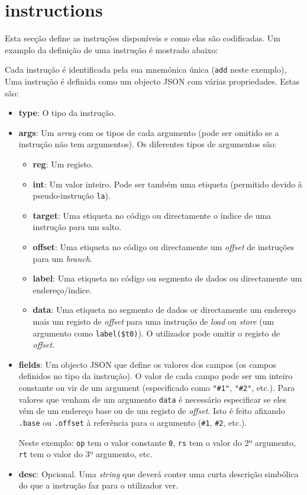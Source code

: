 \documentclass[11pt,a4paper,twoside,titlepage]{report}
\begin{document}
\section{instructions}

Esta secção define as instruções disponíveis e como elas são codificadas.
Um examplo da definição de uma instrução é mostrado abaixo:



Cada instrução é identificada pela sua mnemónica única (\verb+add+ neste exemplo),
Uma instrução é definida como um objecto JSON com várias propriedades. Estas são:

\begin{itemize}
	\item \textbf{type}: O tipo da instrução.
	\item \textbf{args}: Um \emph{array} com os tipos de cada argumento (pode ser
		omitido se a instrução não tem argumentos).
		Os diferentes tipos de argumentos são:
		\begin{itemize}
			\item \textbf{reg}: Um registo.
			\item \textbf{int}: Um valor inteiro. Pode ser também uma etiqueta
				(permitido devido à pseudo-instrução \verb+la+).
			\item \textbf{target}: Uma etiqueta no código ou directamente o índice de
				uma instrução para um salto.
			\item \textbf{offset}: Uma etiqueta no código ou directamente um
				\emph{offset} de instruções para um \emph{branch}.
			\item \textbf{label}: Uma etiqueta no código ou segmento de dados ou
				directamente um endereço/índice.
			\item \textbf{data}: Uma etiqueta no segmento de dados or directamente um
				endereço mais um registo de \emph{offset} para uma instrução de
				\emph{load} ou \emph{store} (um argumento como \verb+label($t0)+). O
				utilizador pode omitir o registo de \emph{offset}.
		\end{itemize}
	\item \textbf{fields}: Um objecto JSON que define os valores dos campos (os
		campos definidos no tipo da instrução). O valor de cada campo pode ser
		um inteiro constante ou vir de um argument (especificado como \verb+"#1"+,
		\verb+"#2"+, etc.).
		Para valores que venham de um argumento \verb+data+ é necessário especificar
		se eles vêm de um endereço base ou de um registo de \emph{offset}.
		Isto é feito afixando \verb+.base+ ou \verb+.offset+ à referência para o
		argumento (\verb+#1+, \verb+#2+, etc.).
		
		Neste exemplo: \verb+op+ tem o valor constante \verb+0+, \verb+rs+ tem
		o valor do 2º argumento, \verb+rt+ tem o valor do 3º argumento, etc.
	\item \textbf{desc}: Opcional. Uma \emph{string} que deverá conter uma
		curta descrição simbólica do que a instrução faz para o utilizador ver.
\end{itemize}
\end{document}

